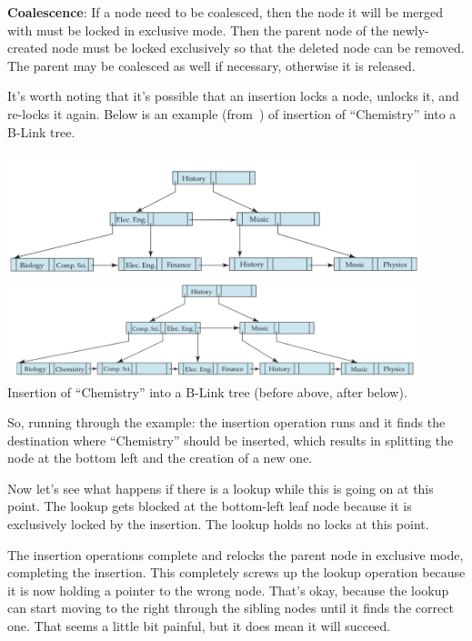 \textbf{Coalescence}: If a node need to be coalesced, then the node it will be merged with must be locked in exclusive mode. Then the parent node of the newly-created node must be locked exclusively so that the deleted node can be removed. The parent may be coalesced as well if necessary, otherwise it is released.

It's worth noting that it's possible that an insertion locks a node, unlocks it, and re-locks it again.  Below is an example (from~\cite{dsc}) of insertion of ``Chemistry'' into a B-Link tree. 

\begin{center}
	\includegraphics[width=0.9\textwidth]{images/b-link1}
	\includegraphics[width=0.9\textwidth]{images/b-link2}\\
	Insertion of ``Chemistry'' into a B-Link tree (before above, after below).~\cite{dsc}
\end{center}

So, running through the example: the insertion operation runs and it finds the destination where ``Chemistry'' should be inserted, which results in splitting the node  at the bottom left and the creation of a new one.  

Now let's see what happens if there is a lookup while this is going on at this point. The lookup gets blocked at the bottom-left leaf node because it is exclusively locked by the insertion. The lookup holds no locks at this point.

The insertion operations complete and relocks the parent node in exclusive mode, completing the insertion. This completely screws up the lookup operation because it is now holding a pointer to the wrong node. That's okay, because the lookup can start moving to the right through the sibling nodes until it finds the correct one. That seems a little bit painful, but it does mean it will succeed.

